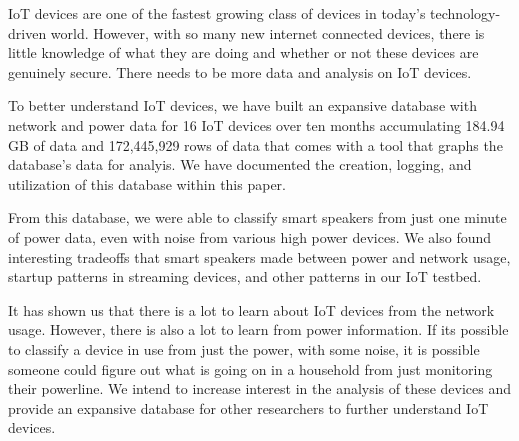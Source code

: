 IoT devices are one of the fastest growing class of devices in today's technology-driven world. However, with so many new internet connected devices, there is little knowledge of what they are doing and whether or not these devices are genuinely secure.  There needs to be more data and analysis on IoT devices.

To better understand IoT devices, we have built an expansive database with network and power data for 16 IoT devices over ten months accumulating 184.94 GB of data and 172,445,929 rows of data that comes with a tool that graphs the database's data for analyis. We have documented the creation, logging, and utilization of this database within this paper.

From this database, we were able to classify smart speakers from just one minute of power data, even with noise from various high power devices. We also found interesting tradeoffs that smart speakers made between power and network usage, startup patterns in streaming devices, and other patterns in our IoT testbed.

It has shown us that there is a lot to learn about IoT devices from the network usage. However, there is also a lot to learn from power information. If its possible to classify a device in use from just the power, with some noise, it is possible someone could figure out what is going on in a household from just monitoring their powerline. We intend to increase interest in the analysis of these devices and provide an expansive database for other researchers to further understand IoT devices.